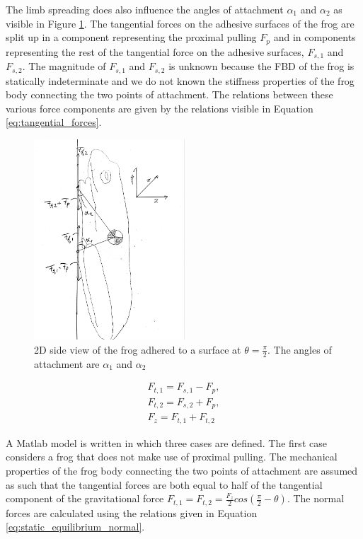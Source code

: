\qquad The limb spreading does also influence the angles of attachment $\alpha_{1}$ and $\alpha_{2}$ as visible in Figure \ref{fig:frog_schematic}. The tangential forces on the adhesive surfaces of the frog are split up in a component representing the proximal pulling $F_{p}$ and in components representing the rest of the tangential force on the adhesive surfaces, $F_{s,1}$ and $F_{s,2}$. The magnitude of $F_{s,1}$ and $F_{s,2}$ is unknown because the FBD of the frog is statically indeterminate and we do not known the stiffness properties of the frog body connecting the two points of attachment. The relations between these various force components are given by the relations visible in Equation \ref{eq:tangential_forces}.\\ 

\begin{figure}[h!]
    \includegraphics[width=0.55\linewidth, height=7.5cm, angle=0]{images/limb spreading/frog_schematic.jpg}
    \caption{2D side view of the frog adhered to a surface at $\theta = \frac{\pi}{2}$. The angles of attachment are $\alpha_{1}$ and $\alpha_{2} $}
    \label{fig:frog_schematic}
\end{figure}

\begin{gather}
     F_{t,1} = F_{s,1} - F_{p},\nonumber\\[1ex]
     F_{t,2} = F_{s,2} + F_{p},\nonumber\\[1ex]
     F_z = F_{t,1} + F_{t,2}    
     \label{eq:tangential_forces}
\end{gather}

\qquad A Matlab model is written in which three cases are defined. The first case considers a frog that does not make use of proximal pulling. The mechanical properties of the frog body connecting the two points of attachment are assumed as such that the tangential forces are both equal to half of the tangential component of the gravitational force $F_{t,1} = F_{t,2} = \frac{F_{z}}{2} cos(\frac{\pi}{2} - \theta)$. The normal forces are calculated using the relations given in Equation \ref{eq:static_equilibrium_normal}.\\

